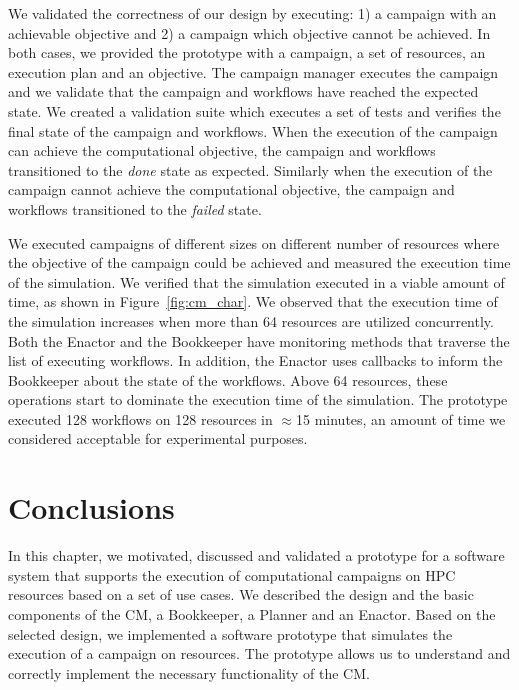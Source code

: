 We validated the correctness of our design by executing: 1) a campaign with an
achievable objective and 2) a campaign which objective cannot be achieved. In
both cases, we provided the prototype with a campaign, a set of resources, an
execution plan and an objective. The campaign manager executes the campaign and
we validate that the campaign and workflows have reached the expected state. We
created a validation suite which executes a set of tests and verifies the final
state of the campaign and workflows. When the execution of the campaign can
achieve the computational objective, the campaign and workflows transitioned to
the \textit{done} state as expected. Similarly when the execution of the
campaign cannot achieve the computational objective, the campaign and workflows
transitioned to the \textit{failed} state. 

We executed campaigns of different sizes on different number of resources where
the objective of the campaign could be achieved and measured the execution time 
of the simulation. We verified that the simulation executed in a viable amount 
of time, as shown in Figure~\ref{fig:cm_char}. We observed that the execution 
time of the simulation increases when more than 64 resources are utilized
concurrently. Both the Enactor and the Bookkeeper have monitoring methods that
traverse the list of executing workflows. In addition, the Enactor uses
callbacks to inform the Bookkeeper about the state of the workflows. Above 64
resources, these operations start to dominate the execution time of the
simulation. The prototype executed 128 workflows on 128 resources in
$\approx$15 minutes, an amount of time we considered acceptable for
experimental purposes.






\section{Conclusions}
\label{sec:cm_concl}
In this chapter, we motivated, discussed and validated a prototype for a
software system that supports the execution of computational campaigns on HPC
resources based on a set of use cases. We described the design and the basic
components of the CM, a Bookkeeper, a Planner and an Enactor.
Based on the selected design, we implemented a software prototype that simulates
the execution of a campaign on resources. The prototype allows us to understand
and correctly implement the necessary functionality of the CM.

